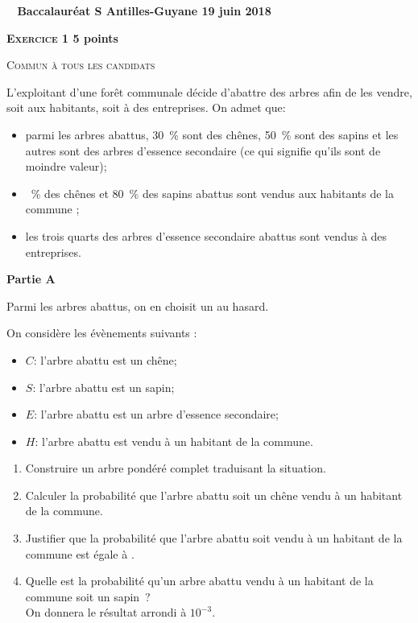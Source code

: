 \documentclass[10pt,a4paper]{article}
\begin{document}
\label{Antilles}
\pagestyle{fancy}
\thispagestyle{empty} 
\begin{center}
{\Large\textbf{\decofourleft~ Baccalauréat S Antilles-Guyane 19 juin 2018 
~\decofourright}}
\end{center}

\def\labelitemi{$\bullet$}

\vspace{1cm}\textbf{\textsc{Exercice 1} \hfill 5 points}

\smallskip
\textsc{Commun à tous les candidats}

\bigskip

L'exploitant d'une forêt communale décide d'abattre des arbres afin de les vendre, soit aux habitants, soit à des entreprises. On admet que:
\begin{itemize}
\item parmi les arbres abattus, 30~\% sont des chênes, 50~\% sont des sapins et les autres sont des arbres d'essence secondaire (ce qui signifie qu'ils sont de moindre valeur);
\item {}~\% des chênes et 80~\% des sapins abattus sont vendus aux habitants de la commune ;
\item les trois quarts des arbres d'essence secondaire abattus sont vendus à des entreprises. 
\end{itemize}

\medskip

\textbf{Partie A}

\smallskip

Parmi les arbres abattus, on en choisit un au hasard.

On considère les évènements suivants :
\begin{itemize}
\item $C$: \og l'arbre abattu est un chêne\fg{};
\item $S$: \og l'arbre abattu est un sapin\fg{};
\item $E$: \og l'arbre abattu est un arbre d'essence secondaire\fg{};
\item $H$: \og l'arbre abattu est vendu à un habitant de la commune\fg{}.
\end{itemize}

\medskip

\begin{enumerate}
\item Construire un arbre pondéré complet traduisant la situation.
\item Calculer la probabilité que l'arbre abattu soit un chêne  vendu à un habitant de la commune.
\item Justifier que la probabilité que l'arbre abattu soit vendu à un habitant de la commune est égale à .
\item Quelle est la probabilité qu'un arbre abattu vendu à un habitant de la commune soit un sapin~?\\On donnera le résultat arrondi  à $10^{-3}$.
\end{enumerate}
\end{document}
